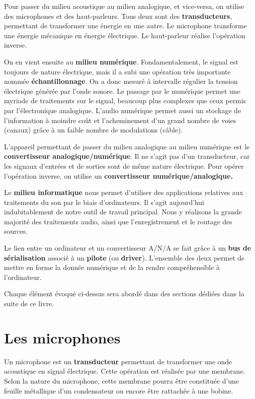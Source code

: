 \documentclass[
  letterpaper,
  DIV=11,
  numbers=noendperiod]{scrreprt}
\begin{document}
Pour passer du milieu acoustique au milieu analogique, et vice-versa, on
utilise des microphones et des haut-parleurs. Tous deux sont des
\textbf{transducteurs}, permettant de transformer une énergie en une
autre. Le microphone transforme une énergie mécanique en énergie
électrique. Le haut-parleur réalise l'opération inverse.

On en vient ensuite au \textbf{milieu numérique}. Fondamentalement, le
signal est toujours de nature électrique, mais il a subi une opération
très importante nommée \textbf{échantillonnage}. On a donc mesuré à
intervalle régulier la tension électrique générée par l'onde sonore. Le
passage par le numérique permet une myriade de traitements sur le
signal, beaucoup plus complexes que ceux permis par l'électronique
analogique. L'audio numérique permet aussi un stockage de l'information
à moindre coût et l'acheminement d'un grand nombre de voies (canaux)
grâce à un faible nombre de modulations (câble).

L'appareil permettant de passer du milieu analogique au milieu numérique
est le \textbf{convertisseur analogique/numérique}. Il ne s'agit pas
d'un transducteur, car les signaux d'entrées et de sorties sont de même
nature électrique. Pour opérer l'opération inverse, on utilise un
\textbf{convertisseur numérique/analogique.}

Le \textbf{milieu informatique} nous permet d'utiliser des applications
relatives aux traitements du son par le biais d'ordinateurs. Il s'agit
aujourd'hui indubitablement de notre outil de travail principal. Nous y
réalisons la grande majorité des traitements audio, ainsi que
l'enregistrement et le routage des sources.

Le lien entre un ordinateur et un convertisseur A/N/A se fait grâce à un
\textbf{bus de sérialisation} associé à un \textbf{pilote} (ou
\textbf{driver}). L'ensemble des deux permet de mettre en forme la
donnée numérique et de la rendre compréhensible à l'ordinateur.

Chaque élément évoqué ci-dessus sera abordé dans des sections dédiées
dans la suite de ce livre.

\hypertarget{les-microphones}{%
\chapter{Les microphones}\label{les-microphones}}

Un microphone est un \textbf{transducteur} permettant de transformer une
onde acoustique en signal électrique. Cette opération est réalisée par
une membrane. Selon la nature du microphone, cette membrane pourra être
constituée d'une feuille métallique d'un condensateur ou encore être
rattachée à une bobine.
\end{document}
